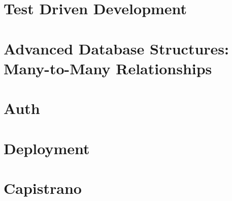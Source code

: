 \documentclass[b5paper,openany]{book}
\begin{document}
\chapter{Test Driven Development}


\chapter{Advanced Database Structures: Many-to-Many Relationships}


\chapter{Auth}


\chapter{Deployment}


\chapter{Capistrano}







\end{document}
